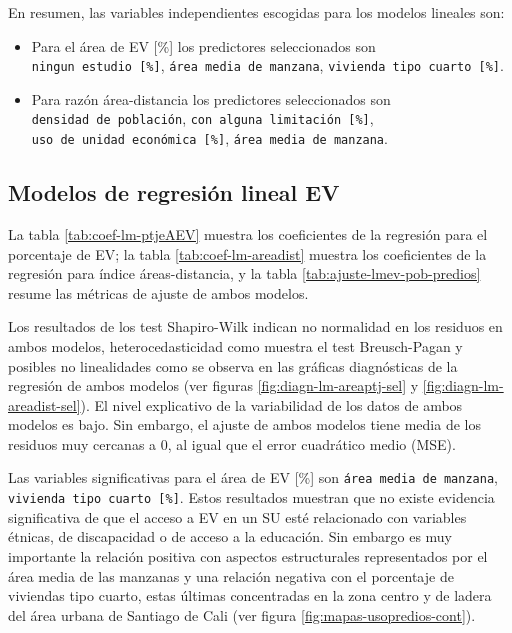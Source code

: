 \documentclass[12pt,a4paper,openany]{book}
\theoremstyle{definition}
\theoremstyle{definition}
\theoremstyle{definition}
\theoremstyle{remark}
\begin{document}
En resumen, las variables independientes escogidas para los modelos
lineales son:

\begin{itemize}
\item
  Para el área de EV {[}\%{]} los predictores seleccionados son
  \texttt{ningun\ estudio\ {[}\%{]}}, \texttt{área\ media\ de\ manzana},
  \texttt{vivienda\ tipo\ cuarto\ {[}\%{]}}.
\item
  Para razón área-distancia los predictores seleccionados son
  \texttt{densidad\ de\ población},
  \texttt{con\ alguna\ limitación\ {[}\%{]}},
  \texttt{uso\ de\ unidad\ económica\ {[}\%{]}},
  \texttt{área\ media\ de\ manzana}.
\end{itemize}

\subsection{Modelos de regresión lineal
EV}\label{modelos-de-regresiuxf3n-lineal-ev}

La tabla \ref{tab:coef-lm-ptjeAEV} muestra los coeficientes de la
regresión para el porcentaje de EV; la tabla \ref{tab:coef-lm-areadist}
muestra los coeficientes de la regresión para índice áreas-distancia, y
la tabla \ref{tab:ajuste-lmev-pob-predios} resume las métricas de ajuste
de ambos modelos.

Los resultados de los test Shapiro-Wilk indican no normalidad en los
residuos en ambos modelos, heterocedasticidad como muestra el test
Breusch-Pagan y posibles no linealidades como se observa en las gráficas
diagnósticas de la regresión de ambos modelos (ver figuras
\ref{fig:diagn-lm-areaptj-sel} y \ref{fig:diagn-lm-areadist-sel}). El
nivel explicativo de la variabilidad de los datos de ambos modelos es
bajo. Sin embargo, el ajuste de ambos modelos tiene media de los
residuos muy cercanas a 0, al igual que el error cuadrático medio (MSE).

Las variables significativas para el área de EV {[}\%{]} son
\texttt{área\ media\ de\ manzana},
\texttt{vivienda\ tipo\ cuarto\ {[}\%{]}}. Estos resultados muestran que
no existe evidencia significativa de que el acceso a EV en un SU esté
relacionado con variables étnicas, de discapacidad o de acceso a la
educación. Sin embargo es muy importante la relación positiva con
aspectos estructurales representados por el área media de las manzanas y
una relación negativa con el porcentaje de viviendas tipo cuarto, estas
últimas concentradas en la zona centro y de ladera del área urbana de
Santiago de Cali (ver figura \ref{fig:mapas-usopredios-cont}).
\end{document}
